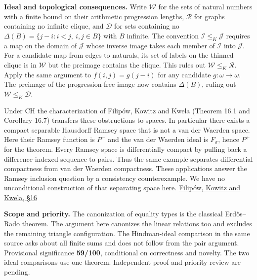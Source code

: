\documentclass[11pt]{article}
\begin{document}
\textbf{Ideal and topological consequences.} Write \(\mathcal W\) for the sets of natural numbers with a finite bound on their arithmetic progression lengths, \(\mathcal R\) for graphs containing no infinite clique, and \(\mathcal D\) for sets containing no \(\Delta(B)=\{j-i:i<j,\ i,j\in B\}\) with \(B\) infinite. The convention \(\mathcal I\le_K\mathcal J\) requires a map on the domain of \(\mathcal J\) whose inverse image takes each member of \(\mathcal I\) into \(\mathcal J\). For a candidate map from edges to naturals, its set of labels on the thinned clique is in \(\mathcal W\) but the preimage contains the clique. This rules out \(\mathcal W\le_K\mathcal R\). Apply the same argument to \(f(i,j)=g(j-i)\) for any candidate \(g:\omega\to\omega\). The preimage of the progression-free image now contains \(\Delta(B)\), ruling out \(\mathcal W\le_K\mathcal D\).

Under CH the characterization of Filipów, Kowitz and Kwela (Theorem 16.1 and Corollary 16.7) transfers these obstructions to spaces. In particular there exists a compact separable Hausdorff Ramsey space that is not a van der Waerden space. Here their Ramsey function is \(P^-\) and the van der Waerden ideal is \(F_\sigma\), hence \(P^+\) for the theorem. Every Ramsey space is differentially compact by pulling back a difference-indexed sequence to pairs. Thus the same example separates differential compactness from van der Waerden compactness. These applications answer the Ramsey inclusion question by a consistency counterexample. We have no unconditional construction of that separating space here. \href{https://doi.org/10.1017/jsl.2024.8}{Filipów, Kowitz and Kwela, §16}

\textbf{Scope and priority.} The canonization of equality types is the classical Erdős--Rado theorem. The argument here canonizes the linear relations too and excludes the remaining triangle configuration. The Hindman-ideal comparison in the same source asks about all finite sums and does not follow from the pair argument. Provisional significance \textbf{59/100}, conditional on correctness and novelty. The two ideal comparisons use one theorem. Independent proof and priority review are pending.
\end{document}
